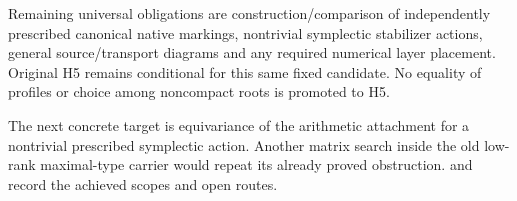Remaining universal obligations are construction/comparison of
independently prescribed canonical native markings, nontrivial
symplectic stabilizer actions, general source/transport diagrams and any
required numerical layer placement. Original H5 remains conditional for
this same fixed candidate. No equality of profiles or choice among
noncompact roots is promoted to H5.

The next concrete target is equivariance of the arithmetic attachment
for a nontrivial prescribed symplectic action. Another matrix search
inside the old low-rank maximal-type carrier would repeat its already
proved obstruction.  and 
record the achieved scopes and open routes.
